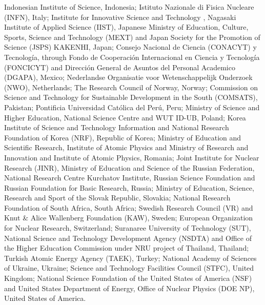 %
Indonesian Institute of Science, Indonesia;
%
Istituto Nazionale di Fisica Nucleare (INFN), Italy;
%
Institute for Innovative Science and Technology , Nagasaki Institute of Applied Science (IIST), Japanese Ministry of Education, Culture, Sports, Science and Technology (MEXT) and Japan Society for the Promotion of Science (JSPS) KAKENHI, Japan;
%
Consejo Nacional de Ciencia (CONACYT) y Tecnolog\'{i}a, through Fondo de Cooperaci\'{o}n Internacional en Ciencia y Tecnolog\'{i}a (FONCICYT) and Direcci\'{o}n General de Asuntos del Personal Academico (DGAPA), Mexico;
%
Nederlandse Organisatie voor Wetenschappelijk Onderzoek (NWO), Netherlands;
%
The Research Council of Norway, Norway;
%
Commission on Science and Technology for Sustainable Development in the South (COMSATS), Pakistan;
%
Pontificia Universidad Cat\'{o}lica del Per\'{u}, Peru;
%
Ministry of Science and Higher Education, National Science Centre and WUT ID-UB, Poland;
%
Korea Institute of Science and Technology Information and National Research Foundation of Korea (NRF), Republic of Korea;
%
Ministry of Education and Scientific Research, Institute of Atomic Physics and Ministry of Research and Innovation and Institute of Atomic Physics, Romania;
%
Joint Institute for Nuclear Research (JINR), Ministry of Education and Science of the Russian Federation, National Research Centre Kurchatov Institute, Russian Science Foundation and Russian Foundation for Basic Research, Russia;
%
Ministry of Education, Science, Research and Sport of the Slovak Republic, Slovakia;
%
National Research Foundation of South Africa, South Africa;
%
Swedish Research Council (VR) and Knut \& Alice Wallenberg Foundation (KAW), Sweden;
%
European Organization for Nuclear Research, Switzerland;
%
Suranaree University of Technology (SUT), National Science and Technology Development Agency (NSDTA) and Office of the Higher Education Commission under NRU project of Thailand, Thailand;
%
Turkish Atomic Energy Agency (TAEK), Turkey;
%
National Academy of  Sciences of Ukraine, Ukraine;
%
Science and Technology Facilities Council (STFC), United Kingdom;
%
National Science Foundation of the United States of America (NSF) and United States Department of Energy, Office of Nuclear Physics (DOE NP), United States of America.